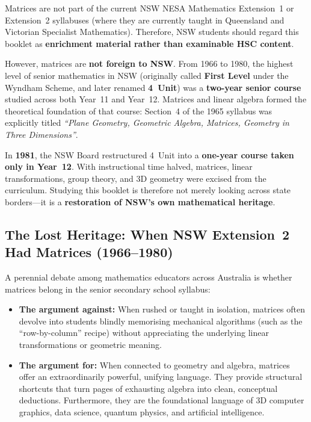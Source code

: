 \documentclass[12pt]{article}
\newenvironment{remark}[1][]{%
  \begin{remarkbox}[title={\bfseries Remark~\thetcbcounter\ifx\relax#1\relax\else\ (#1)\fi}]%
}{%
  \end{remarkbox}%
}
\begin{document}
\begin{remark}[Syllabus Note and Historical Context]
Matrices are not part of the current NSW NESA Mathematics Extension~1 or Extension~2 syllabuses (where they are currently taught in Queensland and Victorian Specialist Mathematics). Therefore, NSW students should regard this booklet as \textbf{enrichment material rather than examinable HSC content}.

However, matrices are \textbf{not foreign to NSW}. From 1966 to 1980, the highest level of senior mathematics in NSW (originally called \textbf{First Level} under the Wyndham Scheme, and later renamed \textbf{4~Unit}) was a \textbf{two-year senior course} studied across both Year~11 and Year~12. Matrices and linear algebra formed the theoretical foundation of that course: Section~4 of the 1965 syllabus was explicitly titled \emph{``Plane Geometry, Geometric Algebra, Matrices, Geometry in Three Dimensions''}.

In \textbf{1981}, the NSW Board restructured 4~Unit into a \textbf{one-year course taken only in Year~12}. With instructional time halved, matrices, linear transformations, group theory, and 3D geometry were excised from the curriculum. Studying this booklet is therefore not merely looking across state borders---it is a \textbf{restoration of NSW's own mathematical heritage}.
\end{remark}

\subsection{The Lost Heritage: When NSW Extension~2 Had Matrices (1966--1980)}

A perennial debate among mathematics educators across Australia is whether matrices belong in the senior secondary school syllabus:
\begin{itemize}[leftmargin=*]
  \item \textbf{The argument against:} When rushed or taught in isolation, matrices often devolve into students blindly memorising mechanical algorithms (such as the ``row-by-column'' recipe) without appreciating the underlying linear transformations or geometric meaning.
  \item \textbf{The argument for:} When connected to geometry and algebra, matrices offer an extraordinarily powerful, unifying language. They provide structural shortcuts that turn pages of exhausting algebra into clean, conceptual deductions. Furthermore, they are the foundational language of 3D computer graphics, data science, quantum physics, and artificial intelligence.
\end{itemize}
\end{document}
